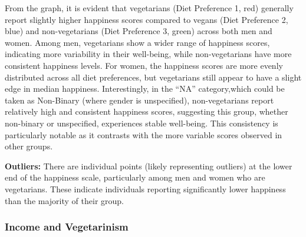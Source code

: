 \documentclass[
]{article}
\begin{document}
From the graph, it is evident that vegetarians (Diet Preference 1, red)
generally report slightly higher happiness scores compared to vegans
(Diet Preference 2, blue) and non-vegetarians (Diet Preference 3, green)
across both men and women. Among men, vegetarians show a wider range of
happiness scores, indicating more variability in their well-being, while
non-vegetarians have more consistent happiness levels. For women, the
happiness scores are more evenly distributed across all diet
preferences, but vegetarians still appear to have a slight edge in
median happiness. Interestingly, in the ``NA'' category,which could be
taken as Non-Binary (where gender is unspecified), non-vegetarians
report relatively high and consistent happiness scores, suggesting this
group, whether non-binary or unspecified, experiences stable well-being.
This consistency is particularly notable as it contrasts with the more
variable scores observed in other groups.

\textbf{Outliers:} There are individual points (likely representing
outliers) at the lower end of the happiness scale, particularly among
men and women who are vegetarians. These indicate individuals reporting
significantly lower happiness than the majority of their group.

\subsubsection{Income and Vegetarinism}\label{income-and-vegetarinism}
\end{document}
